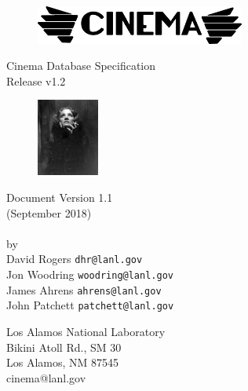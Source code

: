 \thispagestyle{empty}

\begin{ttfamily}
\begin{center}
 \ \ \\
\vspace{1.0 in}
\begin{figure}[h!]
\centering
\includegraphics[height=0.5in]{img/cinema_logo_name}
\end{figure}
\vspace{1.0 in}
Cinema Database Specification \\
\dietrich Release v1.2\\
\bigskip
\begin{figure}[h!]
\centering
\includegraphics[height=1.0in]{img/dietrich_spec_logo}
\end{figure}
\bigskip
Document Version 1.1 \\
(September 2018)\\
\LAUR\\
\bigskip
\bigskip
\bigskip
\bigskip
by \\
\bigskip
David Rogers  \texttt{\small dhr@lanl.gov}\\
Jon Woodring  \texttt{\small woodring@lanl.gov}\\
James Ahrens  \texttt{\small ahrens@lanl.gov}\\
John Patchett \texttt{\small patchett@lanl.gov}\\
\end{center}
\vspace{1.0 in}
\begin{flushright}
Los Alamos National Laboratory\\
Bikini Atoll Rd., SM 30\\
Los Alamos, NM 87545\\
cinema@lanl.gov\\
\end{flushright}
\end{ttfamily}
\newpage

\tableofcontents
\newpage

